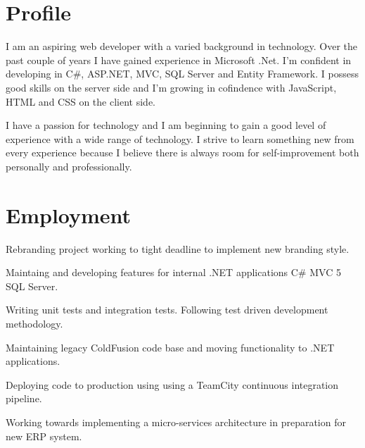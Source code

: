 \documentclass[a4paper]{deedy-resume} %
\newcommand{\Csh}{C{\lserif\#}}
\begin{document}
\hfill
%
%
\begin{minipage}[t]{0.66\textwidth} %

\section{Profile}
I am an aspiring web developer with a varied background in technology. Over the past couple of years I have gained experience in Microsoft .Net. I'm confident in developing in \Csh{}, ASP.NET, MVC, SQL Server and Entity Framework. I possess good skills on the server side and I'm growing in cofindence with JavaScript, HTML and CSS on the client side.

I have a passion for technology and I am beginning to gain a good level of experience with a wide range of technology. I strive to learn something new from every experience because I believe there is always room for self-improvement both personally and professionally.
\sectionspace %

\section{Employment}


\vspace{\topsep} %
\begin{tightitemize}
\item Rebranding project working to tight deadline to implement new branding style.
\item Maintaing and developing features for internal .NET applications \Csh{} MVC 5 SQL Server.
\item Writing unit tests and integration tests. Following test driven development methodology.
\item Maintaining legacy ColdFusion code base and moving functionality to .NET applications.
\item Deploying code to production using using a TeamCity continuous integration pipeline.
\item Working towards implementing a micro-services architecture in preparation for new ERP system.


\end{tightitemize}
\end{minipage}
\end{document}
